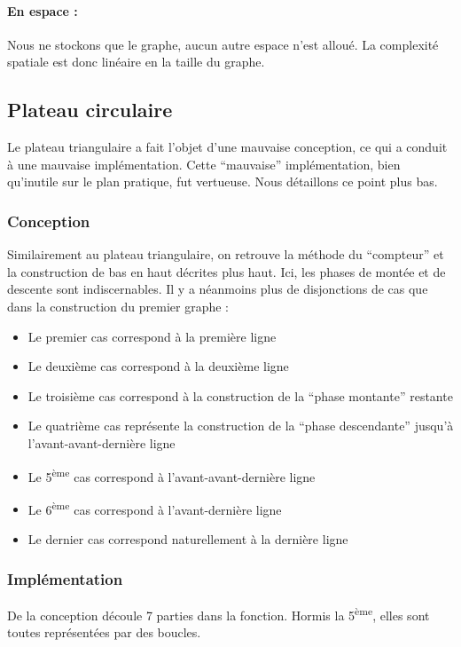 \paragraph{En espace :}
Nous ne stockons que le graphe, aucun autre espace n'est alloué. La complexité spatiale est donc linéaire en la taille du graphe.

\subsection{Plateau circulaire}
Le plateau triangulaire a fait l'objet d'une mauvaise conception, ce qui a conduit à une mauvaise implémentation. Cette ``mauvaise'' implémentation, bien qu'inutile sur le plan pratique, fut vertueuse. Nous détaillons ce point plus bas.

\subsubsection*{Conception}
Similairement au plateau triangulaire, on retrouve la méthode du ``compteur'' et la construction de bas en haut décrites plus haut. Ici, les phases de montée et de descente sont indiscernables. Il y a néanmoins plus de disjonctions de cas que dans la construction du premier graphe :
\begin{itemize}
    \item Le premier cas correspond à la première ligne
    \item Le deuxième cas correspond à la deuxième ligne
    \item Le troisième cas correspond à la construction de la ``phase montante'' restante
    \item Le quatrième cas représente la construction de la ``phase descendante'' jusqu'à l'avant-avant-dernière ligne
    \item Le 5\textsuperscript{ème} cas correspond à l'avant-avant-dernière ligne
    \item Le 6\textsuperscript{ème} cas correspond à l'avant-dernière ligne
    \item Le dernier cas correspond naturellement à la dernière ligne
\end{itemize}

\subsubsection*{Implémentation}
De la conception découle 7 parties dans la fonction. Hormis la 5\textsuperscript{ème}, elles sont toutes représentées par des boucles.

